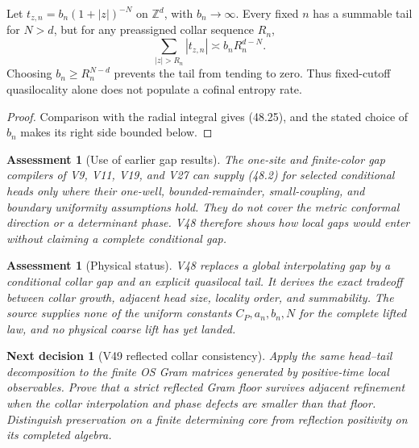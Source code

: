 \documentclass[11pt]{article}
\newtheorem{decision}[theorem]{Next decision}
\newtheorem{assessment}[theorem]{Assessment}
\theoremstyle{remark}
\begin{document}
\begin{countertheorem}
\label{cth:v15v48-nonuniform}
Let \(t_{z,n}=b_n(1+|z|)^{-N}\) on \(\mathbb Z^d\), with
\(b_n\to\infty\).  Every fixed \(n\) has a summable tail for
\(N>d\), but for any preassigned collar sequence \(R_n\),
\[
 \sum_{|z|>R_n}|t_{z,n}|
 \asymp b_nR_n^{d-N}.                                   \tag{48.25}
\]
Choosing \(b_n\geq R_n^{N-d}\) prevents the tail from tending to
zero.  Thus fixed-cutoff quasilocality alone does not populate a
cofinal entropy rate.
\end{countertheorem}

\begin{proof}
Comparison with the radial integral gives (48.25), and the stated
choice of \(b_n\) makes its right side bounded below.
\end{proof}

\begin{assessment}[Use of earlier gap results]
\label{ass:v15v48-gap-use}
The one-site and finite-color gap compilers of V9, V11, V19, and
V27 can supply (48.2) for selected conditional heads only where
their one-well, bounded-remainder, small-coupling, and boundary
uniformity assumptions hold.  They do not cover the metric
conformal direction or a determinant phase.  V48 therefore shows
how local gaps would enter without claiming a complete conditional
gap.
\end{assessment}

\begin{assessment}[Physical status]
\label{ass:v15v48-status}
V48 replaces a global interpolating gap by a conditional collar gap
and an explicit quasilocal tail.  It derives the exact tradeoff
between collar growth, adjacent head size, locality order, and
summability.  The source supplies none of the uniform constants
\(C_P,a_n,b_n,N\) for the complete lifted law, and no physical
coarse lift has yet landed.
\end{assessment}

\begin{decision}[V49 reflected collar consistency]
\label{dec:v15v48-next}
Apply the same head--tail decomposition to the finite OS Gram
matrices generated by positive-time local observables.  Prove that a
strict reflected Gram floor survives adjacent refinement when the
collar interpolation and phase defects are smaller than that floor.
Distinguish preservation on a finite determining core from
reflection positivity on its completed algebra.
\end{decision}
\end{document}
